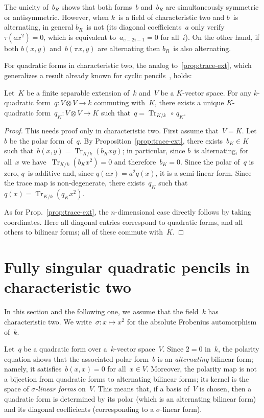 \documentclass{amsart}
\DeclareMathOperator\Tr{Tr}
\begin{document}
The unicity of~$b_R$ shows that both forms~$b$ and~$b_R$ are
simultaneously symmetric or antisymmetric.
However, when $k$~is a field of characteristic two
and $b$~is alternating, in general $b_R$~is not
(its diagonal coefficients~$a$ only verify~$τ(a x^2) = 0$,
which is equivalent to~$a_{e-2i-1} = 0$ for all~$i$).
On the other hand, if both $b(x,y)$ and~$b(π x, y)$ are alternating
then $b_R$~is also alternating.

\medskip
For quadratic forms in characteristic two,
the analog to~\ref{prop:trace-ext},
which generalizes a result already known
for cyclic pencils~\cite[Prop.~5]{MPG2013}, holds:
\begin{prop} \label{prop:trace-quad}
Let~$K$ be a finite separable extension of~$k$ and~$V$ be a $K$-vector
space. For any $k$-quadratic form~$q: V ⊗ V → k$ commuting with~$K$,
there exists a unique $K$-quadratic form~$q_K: V ⊗ V → K$ such that~$q =
\Tr_{K/k} \, ∘ \, q_K$.
\end{prop}
\begin{proof}
This needs proof only in characteristic two.
First assume that~$V = K$.
Let~$b$ be the polar form of~$q$.
By Proposition~\ref{prop:trace-ext},
there exists~$b_K ∈ K$ such that~$b(x,y) = \Tr_{K/k} (b_K xy)$;
in particular, since $b$~is alternating,
for all~$x$ we have~$\Tr_{K/k} (b_K x^2) = 0$ and therefore~$b_K = 0$.
Since the polar of~$q$ is zero, $q$~is additive
and, since $q(a x) = a^2 q(x)$, it is a semi-linear form.
Since the trace map is non-degenerate,
there exists~$q_K$ such that~$q(x) = \Tr_{K/k} (q_K x^2)$.

As for Prop.~\ref{prop:trace-ext}, the $n$-dimensional case directly follows by
taking coordinates. Here all diagonal entries correspond to quadratic
forms, and all others to bilinear forms; all of these commute with~$K$.
\end{proof}



\section{Fully singular quadratic pencils in characteristic two}
\label{S:quad-sing}
In this section and the following one, we assume that the field~$k$ has
characteristic two.
We write~$σ: x ↦ x^2$ for the absolute Frobenius automorphism of~$k$.

Let~$q$ be a quadratic form over a~$k$-vector space~$V$. Since $2 = 0$
in~$k$, the polarity equation shows that the associated polar form~$b$ is
an \emph{alternating} bilinear form; namely, it satisfies~$b(x,x) = 0$
for all~$x ∈ V$. Moreover, the polarity map is not a bijection from
quadratic forms to alternating bilinear forms; its kernel is the space of
\emph{$σ$-linear forms} on~$V$. This means that, if a basis of~$V$ is
chosen, then a quadratic form is determined by its polar (which is an
alternating bilinear form) and its diagonal coefficients (corresponding to a
$σ$-linear form).
\end{document}
